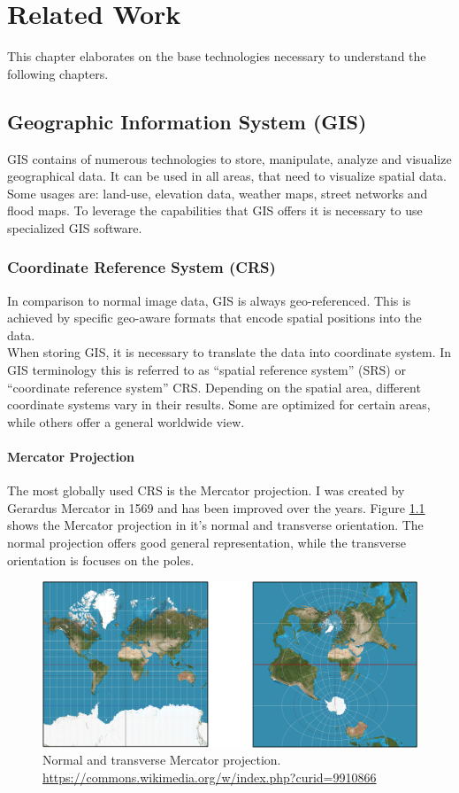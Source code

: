 
\chapter{Related Work}
This chapter elaborates on the base technologies necessary to understand the following chapters.



\section{Geographic Information System (GIS)}
GIS contains of numerous technologies to store, manipulate, analyze and visualize geographical data. It can be used in all areas, that need to visualize spatial data. Some usages are: land-use, elevation data, weather maps, street networks and flood maps. To leverage the capabilities that GIS offers it is necessary to use specialized GIS software.


\subsection{Coordinate Reference System (CRS)}
In comparison to normal image data, GIS is always geo-referenced. This is achieved by specific geo-aware formats that encode spatial positions into the data. \\
When storing GIS, it is necessary to translate the data into coordinate system. In GIS terminology this is referred to as \enquote{spatial reference system} (SRS) or \enquote{coordinate reference system} CRS. Depending on the spatial area, different coordinate systems vary in their results. Some are optimized for certain areas, while others offer a general worldwide view.

\subsubsection{Mercator Projection}
The most globally used CRS is the Mercator projection. I was created by Gerardus Mercator in 1569 and has been improved over the years. Figure \ref{fig:mercator} shows the Mercator projection in it's normal and transverse orientation. The normal projection offers good general representation, while the transverse orientation is focuses on the poles.
\begin{figure}[H]
	\centering\includegraphics[width=1\textwidth]{res/Mercator}
	\caption{Normal and transverse Mercator projection. \url{https://commons.wikimedia.org/w/index.php?curid=9910866}}
	\label{fig:mercator}
\end{figure}

